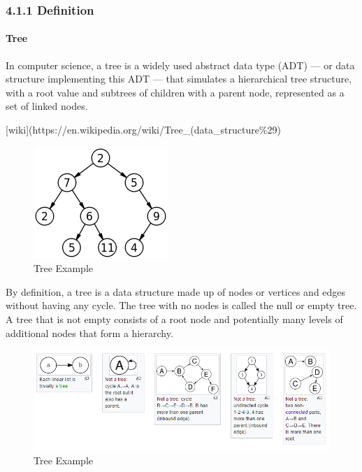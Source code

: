 \documentclass[11pt]{article}
\makeatletter
\def\maxwidth{\ifdim\Gin@nat@width>\linewidth\linewidth
    \else\Gin@nat@width\fi}
\let\Oldincludegraphics\includegraphics
\renewcommand{\includegraphics}[1]{\Oldincludegraphics[width=.8\maxwidth]{#1}}
\makeatother
\begin{document}
\subsubsection{4.1.1 Definition}\label{definition}

\paragraph{Tree}\label{tree}

In computer science, a tree is a widely used abstract data type (ADT)
--- or data structure implementing this ADT --- that simulates a
hierarchical tree structure, with a root value and subtrees of children
with a parent node, represented as a set of linked nodes.

{[}wiki{]}(https://en.wikipedia.org/wiki/Tree\_(data\_structure\%29)

\begin{figure}
\centering
\includegraphics{source/lesson6_binarytree_btexample.png}
\caption{Tree Example}
\end{figure}

By definition, a tree is a data structure made up of nodes or vertices
and edges without having any cycle. The tree with no nodes is called the
null or empty tree. A tree that is not empty consists of a root node and
potentially many levels of additional nodes that form a hierarchy.

\begin{figure}
\centering
\includegraphics{source/lesson6_binarytree_treeexample.png}
\caption{Tree Example}
\end{figure}
\end{document}
